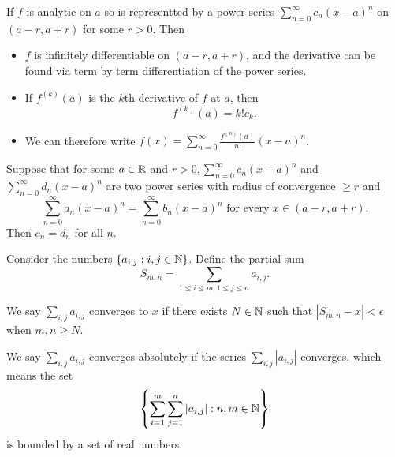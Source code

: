 \documentclass[twoside]{article}
\begin{document}
\begin{definition}
    If $f$ is analytic on $a$ so is representted by a power series 
    $\sum_{n = 0}^{\infty}c_{n}(x - a)^{n}$ on $(a - r, a + r)$
    for some $r > 0$. Then 
    \begin{itemize}
        \item $f$ is infinitely differentiable on $(a - r, a + r)$, and
            the derivative can be found via term by term differentiation
            of the power series.
        \item If $f^{(k)}(a)$ is the $k$th derivative of $f$ at $a$, then
            \begin{equation*}
                f^{(k)}(a) = k!c_{k}.
            \end{equation*}
        \item We can therefore write $f(x) = \sum_{n = 0}^{\infty}\frac{f^{(n)}(a)}{n!}(x - a)^{n}$.
    \end{itemize}
\end{definition}

\begin{theorem}
    Suppose that for some $a \in \mathbb{R}$ and $r > 0, \sum_{n = 0}^{\infty}c_{n}(x - a)^{n}$
    and $\sum_{n = 0}^{\infty}d_{n}(x - a)^{n}$ are two power series
    with radius of convergence $\geq r$ and 
    \begin{equation*}
        \sum_{n = 0}^{\infty}a_{n}(x - a)^{n} = \sum_{n= 0}^{\infty}b_{n}(x - a)^{n}
        \text{ for every } x \in (a - r, a+ r).
    \end{equation*}
    Then $c_{n} = d_{n}$ for all $n$.
\end{theorem}


\begin{definition}
    Consider the numbers $\{a_{i, j} : i,j \in \mathbb{N}\}$. Define the partial sum 
    \begin{equation*}
        S_{m,n} = \sum_{1 \leq i \leq m, 1 \leq j \leq n} a_{i,j}.
    \end{equation*}

    We say $\sum_{i,j} a_{i,j}$ converges to $x$ if there exists $N \in \mathbb{N}$ such that
    $|S_{m,n} - x| < \epsilon$ when $m,n \geq N$.

    We say $\sum_{i,j} a_{i,j}$ converges absolutely if the series $\sum_{i,j} |a_{i,j}|$
    converges, which means the set 
    \begin{equation*}
        \left\{\sum_{i = 1}^{m}\sum_{j = 1}^{n} |a_{i,j}| : n,m \in \mathbb{N} \right\}
    \end{equation*}
    is bounded by a set of real numbers.
\end{definition}
\end{document}
